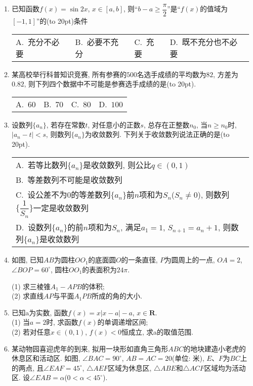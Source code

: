 \documentclass[10pt,a4paper]{article}
\newcommand{\bracket}[1]{(\hbox to #1pt{})}
\newcommand{\onech}[4]{\par\begin{tabular}{p{.9\textwidth}}
A.~#1\\
B.~#2\\
C.~#3\\
D.~#4
\end{tabular}}
\newcommand{\fourch}[4]{\par\begin{tabular}{p{.23\textwidth}p{.23\textwidth}p{.23\textwidth}p{.23\textwidth}}
A.~#1 &B.~#2& C.~#3& D.~#4
\end{tabular}}
\begin{document}
\begin{enumerate}[1.]
\item 已知函数$f(x)=\sin 2x$, $x\in [a,b]$, 则``$b-a\ge \dfrac{\pi}2$''是``$f(x)$的值域为$[-1,1]$''的\bracket{20}条件
\fourch{充分不必要}{必要不充分}{充要}{既不充分也不必要}
\item 某高校举行科普知识竞赛, 所有参赛的$500$名选手成绩的平均数为$82$, 方差为$0.82$, 则下列四个数据中不可能是参赛选手成绩的是\bracket{20}.
\fourch{$60$}{$70$}{$80$}{$100$}
\item 设数列$\{a_n\}$, 若存在常数$t$, 对任意小的正数$s$, 总存在正整数$n_0$, 当$n\ge n_0$时, $|a_n-t|<s$, 则数列$\{a_n\}$为收敛数列. 下列关于收敛数列说法正确的是\bracket{20}.
\onech{若等比数列$\{a_n\}$是收敛数列, 则公比$q\in (0,1)$}{等差数列不可能是收敛数列}{设公差不为$0$的等差数列$\{a_n\}$前$n$项和为$S_n$($S_n\ne 0$), 则数列$\{\dfrac 1{S_n}\}$一定是收敛数列}{设数列$\{a_n\}$的前$n$项和为$S_n$, 满足$a_1=1$, ${S_{n+1}}=a_n+1$, 则数列$\{a_n\}$是收敛数列}
\item 如图, 已知$AB$为圆柱$OO_1$的底面圆$O$的一条直径, $P$为圆周上的一点, $OA=2$, $\angle BOP=60^{\circ}$, 圆柱$OO_1$的表面积为$24\pi$.
\begin{center}
\end{center}
(1) 求三棱锥$A_1-APB$的体积;\\
(2) 求直线$AP$与平面$A_1PB$所成的角的大小.
\item 已知a为实数, 函数$f(x)=x|x-a|-a$, $x\in \mathbf{R}$.\\
(1) 当$a=2$时, 求函数$f(x)$的单调递增区间;\\
(2) 若对任意$x\in (0,1)$, $f(x)<0$恒成立, 求a的取值范围.
\item 某动物园喜迎虎年的到来, 拟用一块形如直角三角形$ABC$的地块建造小老虎的休息区和活动区. 如图, $\angle BAC=90^\circ$, $AB=AC=20$(单位: 米), $E$、$F$为$BC$上的两点, 且$\angle EAF=45^\circ$, $\triangle AEF$区域为休息区, $\triangle ABE$和$\triangle ACF$区域均为活动区. 设$\angle EAB=\alpha$($0<\alpha <45^\circ$).
\begin{center}

\end{center}
\end{enumerate}
\end{document}
